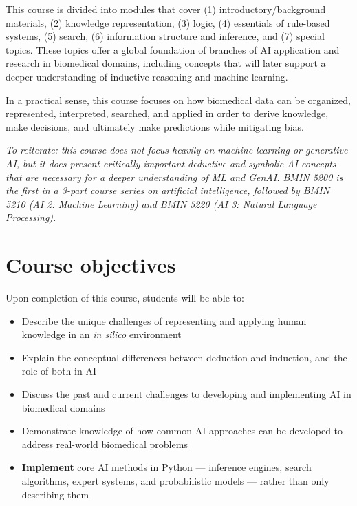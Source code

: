 \documentclass[11pt]{article}
\begin{document}
This course is divided into modules that cover (1) introductory/background materials,
(2) knowledge representation, (3) logic, (4) essentials of rule-based systems, (5) search,
(6) information structure and inference, and (7) special topics. These topics offer a global
foundation of branches of AI application and research in biomedical domains, including concepts
that will later support a deeper understanding of inductive reasoning and machine learning.

In a practical sense, this course focuses on how biomedical data can be organized, represented,
interpreted, searched, and applied in order to derive knowledge, make decisions, and ultimately
make predictions while mitigating bias.

\emph{To reiterate: this course does not focus heavily on machine learning or generative AI, but
it does present critically important deductive and symbolic AI concepts that are necessary for a
deeper understanding of ML and GenAI. BMIN 5200 is the first in a 3-part course series on
artificial intelligence, followed by BMIN 5210 (AI 2: Machine Learning) and BMIN 5220 (AI 3:
Natural Language Processing).}

\section{Course objectives}

Upon completion of this course, students will be able to:

\begin{itemize}
  \item Describe the unique challenges of representing and applying human knowledge in an
        \emph{in silico} environment
  \item Explain the conceptual differences between deduction and induction, and the role of both
        in AI
  \item Discuss the past and current challenges to developing and implementing AI in biomedical
        domains
  \item Demonstrate knowledge of how common AI approaches can be developed to address real-world
        biomedical problems
  \item \textbf{Implement} core AI methods in Python --- inference engines, search algorithms,
        expert systems, and probabilistic models --- rather than only describing them
\end{itemize}
\end{document}
